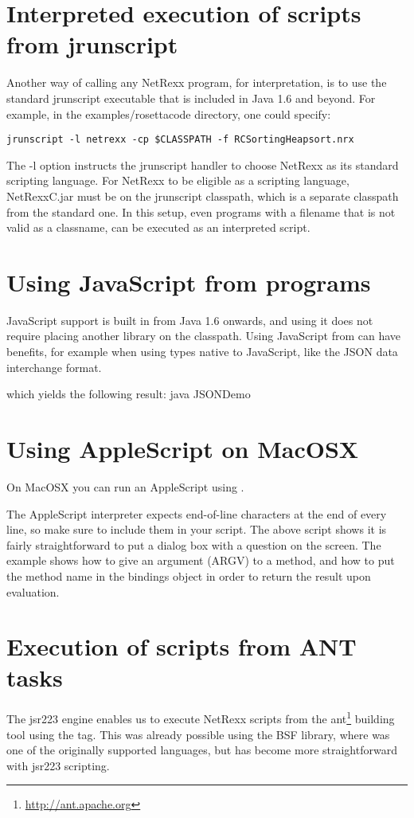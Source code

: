  \section{Interpreted execution of \nr{} scripts from jrunscript}
 Another way of calling any NetRexx program, for interpretation, is to use the standard jrunscript executable that is included in Java 1.6 and beyond. For example, in the examples/rosettacode directory, one could specify:
\begin{verbatim}
jrunscript -l netrexx -cp $CLASSPATH -f RCSortingHeapsort.nrx
\end{verbatim}
The -l option instructs the jrunscript handler to choose NetRexx as
its standard scripting language. For NetRexx to be eligible as a
scripting language, NetRexxC.jar must be on the jrunscript classpath,
which is a separate classpath from the standard one. In this setup,
even \nr{} programs with a filename that is not valid as a classname,
can be executed as an interpreted script.

\section{Using JavaScript from \nr{} programs}
JavaScript support is built in from Java 1.6 onwards, and using it
does not require placing another library on the classpath.
Using JavaScript from \nr{} can have benefits, for example when using types native
to JavaScript, like the JSON data interchange format.


which yields the following result:
\bash[stdout]
java JSONDemo
\END

\section{Using AppleScript on MacOSX}
On MacOSX you can run an AppleScript using \nr{}. 

 The AppleScript interpreter expects end-of-line characters at the end
 of every line, so make sure to include them in your script. The above
 script shows it is fairly straightforward to put a dialog box with a
 question on the screen. The example shows how to give an argument
 (ARGV) to a method, and how to put the method name in the bindings
 object in order to return the result upon evaluation. 
 
\section{Execution of \nr{} scripts from ANT tasks}
The jsr223 engine enables us to execute NetRexx scripts from the
ant\footnote{\url{http://ant.apache.org}} building tool using the
 tag. This was already possible using the BSF library,
where \nr{} was one of the originally supported languages,
but has become more straightforward with jsr223 scripting.


